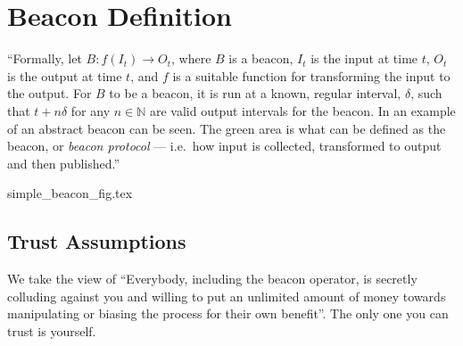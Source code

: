 \section{Beacon Definition}


\enquote{Formally, let $B: f(I_t) \rightarrow O_t$, where $B$ is a beacon, $I_t$ is the input at time $t$, $O_t$ is the output at time $t$, and $f$ is a suitable function for transforming the input to the output.
For $B$ to be a beacon, it is run at a known, regular interval, $\delta$, such that $t+n\delta$ for any $n \in \mathbb{N}$ are valid output intervals for the beacon.
In  an example of an abstract beacon can be seen.
The green area is what can be defined as the beacon, or \emph{beacon protocol} --- i.e.\ how input is collected, transformed to output and then published.}

{simple_beacon_fig.tex}


\subsection{Trust Assumptions}

We take the view of \enquote{Everybody, including the beacon operator, is secretly colluding against you and willing to put an unlimited amount of money towards manipulating or biasing the process for their own benefit}.
The only one you can trust is yourself.
